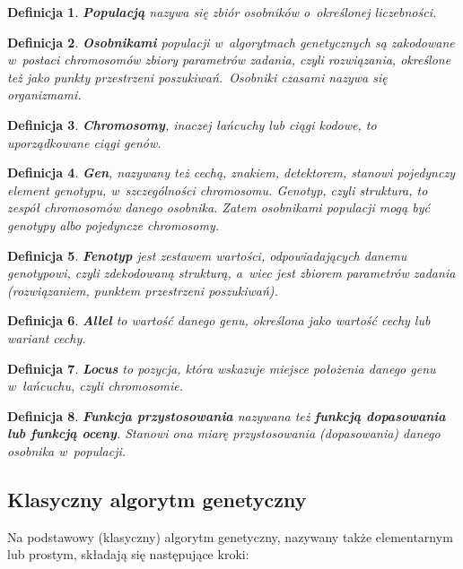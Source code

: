 \documentclass[twoside,12pt]{report}
\newtheorem{definition}{Definicja} %
\begin{document}
\begin{definition}
\textbf{Populacją} nazywa się zbiór osobników o~określonej liczebności.
\end{definition}

\begin{definition}
\textbf{Osobnikami} populacji w~algorytmach genetycznych są zakodowane w~postaci chromosomów zbiory parametrów zadania, czyli rozwiązania, określone też jako punkty przestrzeni poszukiwań.~Osobniki czasami nazywa się organizmami.
\end{definition}

\begin{definition}
\textbf{Chromosomy}, inaczej łańcuchy lub ciągi kodowe, to uporządkowane ciągi genów.
\end{definition}

\begin{definition}
\textbf{Gen}, nazywany też cechą, znakiem, detektorem, stanowi pojedynczy element genotypu, w~szczególności chromosomu. Genotyp, czyli struktura, to zespół chromosomów danego osobnika. Zatem osobnikami populacji mogą być genotypy albo pojedyncze chromosomy.
\end{definition}

\begin{definition}
\textbf{Fenotyp} jest zestawem wartości, odpowiadających danemu genotypowi, czyli zdekodowaną strukturą, a~wiec jest zbiorem parametrów zadania (rozwiązaniem, punktem przestrzeni poszukiwań).
\end{definition}

\begin{definition}
\textbf{Allel} to wartość danego genu, określona jako wartość cechy lub wariant cechy.
\end{definition}

\begin{definition}
\textbf{Locus} to pozycja, która wskazuje miejsce położenia danego genu w~łańcuchu, czyli chromosomie.
\end{definition}

\begin{definition}
\textbf{Funkcja przystosowania} nazywana też \textbf{funkcją dopasowania lub funkcją oceny}. Stanowi ona miarę przystosowania (dopasowania) danego osobnika w~populacji.
\end{definition}

\subsection{Klasyczny algorytm genetyczny}
Na podstawowy (klasyczny) algorytm genetyczny, nazywany także elementarnym lub prostym, składają się następujące kroki:
\end{document}
